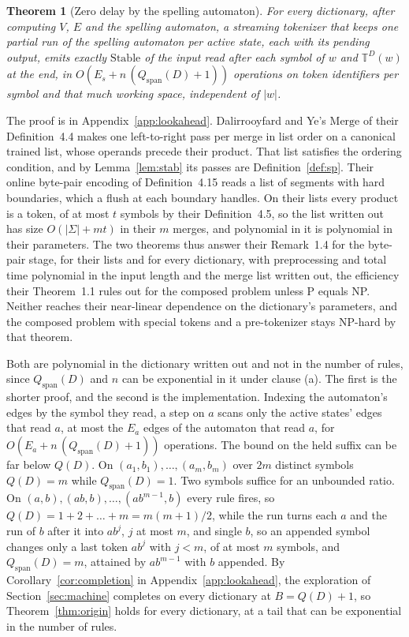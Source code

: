 \documentclass[11pt,a4paper]{article}
\theoremstyle{definition}
\theoremstyle{plain}
\newtheorem{theorem}{Theorem}
\newcommand{\T}{\mathbb{T}}
\newcommand{\Stable}{\mathrm{Stable}}
\begin{document}
\begin{theorem}[Zero delay by the spelling automaton]\label{thm:zerodelayauto}
For every dictionary, after computing \(V\), \(E\) and the spelling automaton, a streaming tokenizer that keeps one
partial run of the spelling automaton per active state, each with its pending output, emits exactly \(\Stable\) of the
input read after each symbol of \(w\) and \(\T^D(w)\) at the end, in \(O(E_s + n\,(Q_{\mathrm{span}}(D) + 1))\)
operations on token identifiers per symbol and that much working space, independent of \(|w|\).
\end{theorem}

The proof is in Appendix~\ref{app:lookahead}. Dalirrooyfard and Ye's \(\mathrm{Merge}\) of their Definition~4.4 makes
one left-to-right pass per merge in list order on a canonical trained list, whose operands precede their product. That
list satisfies the ordering condition, and by Lemma~\ref{lem:stab} its passes are Definition~\ref{def:sp}. Their online
byte-pair encoding of Definition~4.15 reads a list of segments with hard boundaries, which a flush at each boundary
handles. On their lists every product is a token, of at most \(t\) symbols by their Definition~4.5, so the list written
out has size \(O(|\Sigma| + mt)\) in their \(m\) merges, and polynomial in it is polynomial in their parameters. The two
theorems thus answer their Remark~1.4 for the byte-pair stage, for their lists and for every dictionary, with
preprocessing and total time polynomial in the input length and the merge list written out, the efficiency their
Theorem~1.1 rules out for the composed problem unless P equals NP. Neither reaches their near-linear dependence on the
dictionary's parameters, and the composed problem with special tokens and a pre-tokenizer stays NP-hard by that theorem.

Both are polynomial in the dictionary written out and not in the number of rules, since \(Q_{\mathrm{span}}(D)\) and
\(n\) can be exponential in it under clause (a). The first is the shorter proof, and the second is the implementation.
Indexing the automaton's edges by the symbol they read, a step on \(a\) scans only the active states' edges that read
\(a\), at most the \(E_a\) edges of the automaton that read \(a\), for \(O(E_a + n\,(Q_{\mathrm{span}}(D) + 1))\)
operations. The bound on the held suffix can be far below \(Q(D)\). On \((a_1, b_1), \dots, (a_m, b_m)\) over \(2m\)
distinct symbols \(Q(D) = m\) while \(Q_{\mathrm{span}}(D) = 1\). Two symbols suffice for an unbounded ratio. On
\((a, b), (ab, b), \dots, (ab^{m-1}, b)\) every rule fires, so \(Q(D) = 1 + 2 + \dots + m = m(m + 1)/2\), while the run
turns each \(a\) and the run of \(b\) after it into \(ab^j\), \(j\) at most \(m\), and single \(b\), so an appended
symbol changes only a last token \(ab^j\) with \(j < m\), of at most \(m\) symbols, and \(Q_{\mathrm{span}}(D) = m\),
attained by \(ab^{m-1}\) with \(b\) appended. By Corollary~\ref{cor:completion} in Appendix~\ref{app:lookahead}, the
exploration of Section~\ref{sec:machine} completes on every dictionary at \(B = Q(D) + 1\), so Theorem~\ref{thm:origin}
holds for every dictionary, at a tail that can be exponential in the number of rules.
\end{document}
